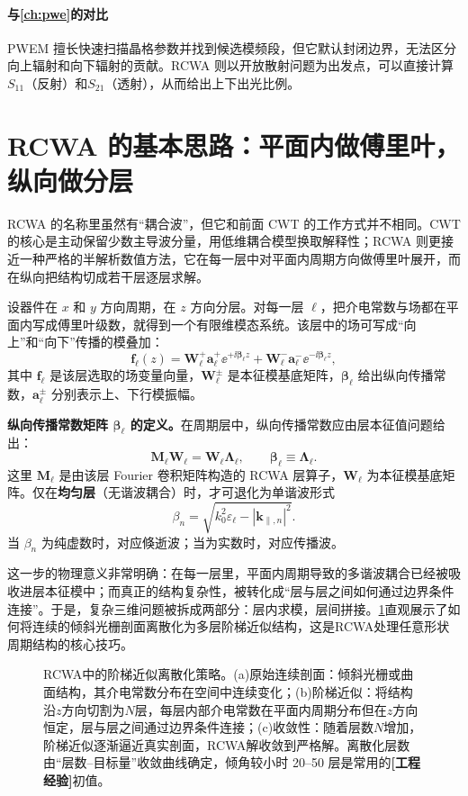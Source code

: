 \paragraph{与\cref{ch:pwe}的对比} PWEM 擅长快速扫描晶格参数并找到候选模频段，但它默认封闭边界，无法区分向上辐射和向下辐射的贡献。RCWA 则以开放散射问题为出发点，可以直接计算$S_{11}$（反射）和$S_{21}$（透射），从而给出上下出光比例。

\section{RCWA 的基本思路：平面内做傅里叶，纵向做分层}
RCWA 的名称里虽然有“耦合波”，但它和前面 CWT 的工作方式并不相同。CWT 的核心是主动保留少数主导波分量，用低维耦合模型换取解释性；RCWA 则更接近一种严格的半解析数值方法，它在每一层中对平面内周期方向做傅里叶展开，而在纵向把结构切成若干层逐层求解。

设器件在 $x$ 和 $y$ 方向周期，在 $z$ 方向分层。对每一层 $\ell$，把介电常数与场都在平面内写成傅里叶级数，就得到一个有限维模态系统。该层中的场可写成“向上”和“向下”传播的模叠加：
\begin{equation}
\bm{f}_\ell(z)
=
\mathbf{W}_\ell^+\bm{a}_\ell^+\ee^{+\ii\mathbf{\beta}_\ell z}
+
\mathbf{W}_\ell^-\bm{a}_\ell^-\ee^{-\ii\mathbf{\beta}_\ell z},
\label{eq:rcwa_layer_field}
\end{equation}
其中 $\bm{f}_\ell$ 是该层选取的场变量向量，$\mathbf{W}_\ell^{\pm}$ 是本征模基底矩阵，$\mathbf{\beta}_\ell$ 给出纵向传播常数，$\bm{a}_\ell^{\pm}$ 分别表示上、下行模振幅。
\begin{notebox}
\textbf{纵向传播常数矩阵 $\mathbf{\beta}_\ell$ 的定义。}在周期层中，纵向传播常数应由层本征值问题给出：
\[
\mathbf{M}_\ell \mathbf{W}_\ell
=
\mathbf{W}_\ell \mathbf{\Lambda}_\ell,
\qquad
\mathbf{\beta}_\ell \equiv \mathbf{\Lambda}_\ell.
\]
这里 $\mathbf{M}_\ell$ 是由该层 Fourier 卷积矩阵构造的 RCWA 层算子，$\mathbf{W}_\ell$ 为本征模基底矩阵。仅在\textbf{均匀层}（无谐波耦合）时，才可退化为单谐波形式
\[
\beta_n = \sqrt{k_0^2\varepsilon_\ell-|\bm{k}_{\parallel,n}|^2}.
\]
当 $\beta_n$ 为纯虚数时，对应倏逝波；当为实数时，对应传播波。
\end{notebox}
这一步的物理意义非常明确：在每一层里，平面内周期导致的多谐波耦合已经被吸收进层本征模中；而真正的结构复杂性，被转化成“层与层之间如何通过边界条件连接”。于是，复杂三维问题被拆成两部分：层内求模，层间拼接。\cref{fig:ch13_rcwa_discretization}直观展示了如何将连续的倾斜光栅剖面离散化为多层阶梯近似结构，这是RCWA处理任意形状周期结构的核心技巧。

\begin{figure}[htbp]
  \centering
  
  \caption{RCWA中的阶梯近似离散化策略。(a)原始连续剖面：倾斜光栅或曲面结构，其介电常数分布在空间中连续变化；(b)阶梯近似：将结构沿$z$方向切割为$N$层，每层内部介电常数在平面内周期分布但在$z$方向恒定，层与层之间通过边界条件连接；(c)收敛性：随着层数$N$增加，阶梯近似逐渐逼近真实剖面，RCWA解收敛到严格解。离散化层数由“层数--目标量”收敛曲线确定，倾角较小时 20--50 层是常用的\textbf{[工程经验]}初值\cite{li1996,moharam1981}。}
  \label{fig:ch13_rcwa_discretization}
\end{figure}

